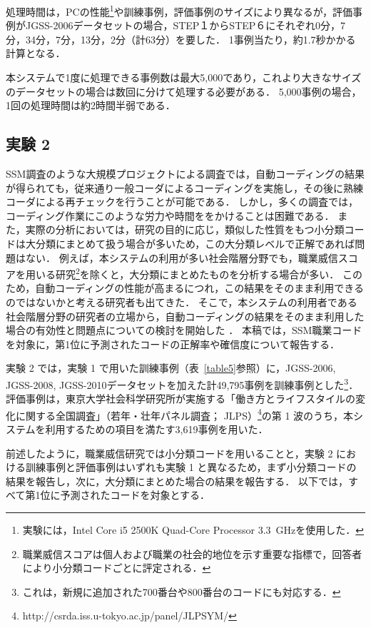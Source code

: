 \documentclass[japanese]{jnlp_1.4}
\begin{document}
処理時間は，PCの性能\footnote{実験には，Intel Core i5 2500K Quad-Core Processor 3.3~GHzを使用した．}や訓練事例，評価事例のサイズにより異なるが，評価事例がJGSS-2006データセットの場合，STEP１からSTEP６にそれぞれ0分，7分，34分，7分，13分，2分（計63分）を要した．
1事例当たり，約1.7秒かかる計算となる．

本システムで1度に処理できる事例数は最大5,000であり，これより大きなサイズのデータセットの場合は数回に分けて処理する必要がある．
5,000事例の場合，1回の処理時間は約2時間半弱である．


\subsection{実験 2}

SSM調査のような大規模プロジェクトによる調査では，自動コーディングの結果が得られても，従来通り一般コーダによるコーディングを実施し，その後に熟練コーダによる再チェックを行うことが可能である．
しかし，多くの調査では，コーディング作業にこのような労力や時間ををかけることは困難である．
また，実際の分析においては，研究の目的に応じ，類似した性質をもつ小分類コードは大分類にまとめて扱う場合が多いため，この大分類レベルで正解であれば問題はない．
例えば，本システムの利用が多い社会階層分野でも，職業威信スコアを用いる研究\footnote{職業威信スコアは個人および職業の社会的地位を示す重要な指標で，回答者により小分類コードごとに評定される．}を除くと，大分類にまとめたものを分析する場合が多い．
このため，自動コーディングの性能が高まるにつれ，この結果をそのまま利用できるのではないかと考える研究者も出てきた． 
そこで，本システムの利用者である社会階層分野の研究者の立場から，自動コーディングの結果をそのまま利用した場合の有効性と問題点についての検討を開始した \cite{Takahashi_et_al16}．
本稿では，SSM職業コードを対象に，第1位に予測されたコードの正解率や確信度について報告する．

実験 2 では，実験 1 で用いた訓練事例（表~\ref{table5}参照）に，JGSS-2006, JGSS-2008, JGSS-2010データセットを加えた計49,795事例を訓練事例とした\footnote{これは，新規に追加された700番台や800番台のコードにも対応する．}．
評価事例は，東京大学社会科学研究所が実施する「働き方とライフスタイルの変化に関する全国調査」（若年・壮年パネル調査；
\linebreak
JLPS）\footnote{http://csrda.iss.u-tokyo.ac.jp/panel/JLPSYM/}の第 1 波のうち，本システムを利用するための項目を満たす3,619事例を用いた．

前述したように，職業威信研究では小分類コードを用いることと，実験 2 における訓練事例と評価事例はいずれも実験 1 と異なるため，まず小分類コードの結果を報告し，次に，大分類にまとめた場合の結果を報告する．
以下では，すべて第1位に予測されたコードを対象とする．
\end{document}
